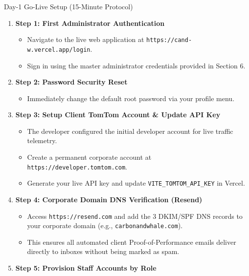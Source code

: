 \documentclass[11pt,a4paper]{article}
\begin{document}
\begin{checklistbox}{Day-1 Go-Live Setup (15-Minute Protocol)}
\begin{enumerate}[leftmargin=1.4em, itemsep=4pt]
    \item[\textbf{[ ]}] \textbf{Step 1: First Administrator Authentication}
    \begin{itemize}[leftmargin=1em, itemsep=2pt]
        \item Navigate to the live web application at \texttt{https://cand-w.vercel.app/login}.
        \item Sign in using the master administrator credentials provided in Section 6.
    \end{itemize}
    \item[\textbf{[ ]}] \textbf{Step 2: Password Security Reset}
    \begin{itemize}[leftmargin=1em, itemsep=2pt]
        \item Immediately change the default root password via your profile menu.
    \end{itemize}
    \item[\textbf{[ ]}] \textbf{Step 3: Setup Client TomTom Account \& Update API Key}
    \begin{itemize}[leftmargin=1em, itemsep=2pt]
        \item The developer configured the initial developer account for live traffic telemetry.
        \item Create a permanent corporate account at \texttt{https://developer.tomtom.com}.
        \item Generate your live API key and update \texttt{VITE\_TOMTOM\_API\_KEY} in Vercel.
    \end{itemize}
    \item[\textbf{[ ]}] \textbf{Step 4: Corporate Domain DNS Verification (Resend)}
    \begin{itemize}[leftmargin=1em, itemsep=2pt]
        \item Access \texttt{https://resend.com} and add the 3 DKIM/SPF DNS records to your corporate domain (e.g., \texttt{carbonandwhale.com}).
        \item This ensures all automated client Proof-of-Performance emails deliver directly to inboxes without being marked as spam.
    \end{itemize}
    \item[\textbf{[ ]}] \textbf{Step 5: Provision Staff Accounts by Role}
    \begin{itemize}[leftmargin=1em, itemsep=2pt]

\end{itemize}
\end{enumerate}
\end{checklistbox}
\end{document}
